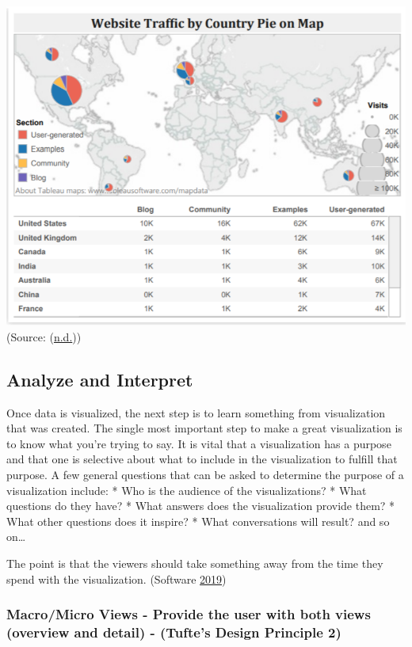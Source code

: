 \documentclass[]{book}
\begin{document}
\includegraphics{images/Image7.png}
(Source: (\protect\hyperlink{ref-DataVizBestPrac}{n.d.}))

\hypertarget{analyze-and-interpret}{%
\subsection{Analyze and Interpret}\label{analyze-and-interpret}}

Once data is visualized, the next step is to learn something from visualization that was created. The single most important step to make a great visualization is to know what you're trying to say. It is vital that a visualization has a purpose and that one is selective about what to include in the visualization to fulfill that purpose. A few general questions that can be asked to determine the purpose of a visualization include:
* Who is the audience of the visualizations?
* What questions do they have?
* What answers does the visualization provide them?
* What other questions does it inspire?
* What conversations will result? and so on\ldots{}

The point is that the viewers should take something away from the time they spend with the visualization. (Software \protect\hyperlink{ref-analyze_viz}{2019})

\hypertarget{macromicro-views---provide-the-user-with-both-views-overview-and-detail---tuftes-design-principle-2}{%
\subsubsection{Macro/Micro Views - Provide the user with both views (overview and detail) - (Tufte's Design Principle 2)}\label{macromicro-views---provide-the-user-with-both-views-overview-and-detail---tuftes-design-principle-2}}
\end{document}
